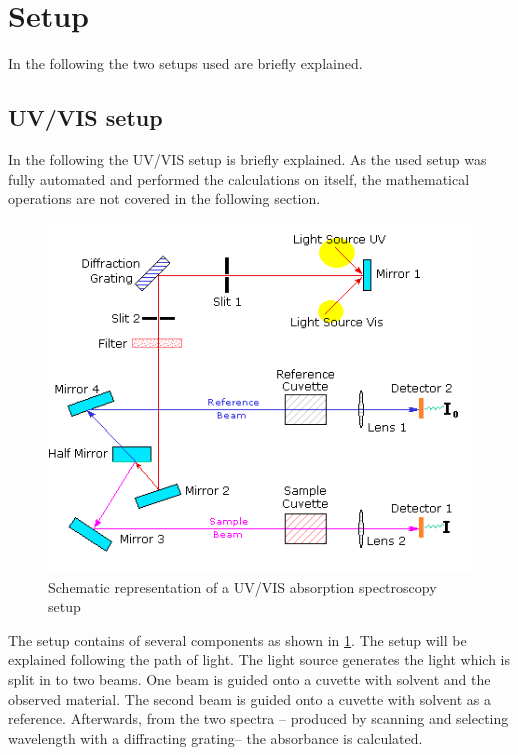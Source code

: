 \section{Setup}
\label{sec:Setup}
In the following the two setups used are briefly explained. 

\subsection{UV/VIS setup}

In the following the UV/VIS setup is briefly explained. As the used setup was fully automated and performed the calculations on 
itself, the mathematical operations are not covered in the following section.

\begin{figure}[ht]
    \centering
    \includegraphics[width = 13cm]{Bilder/Grundlagen/UVVISsetup.png}
    \caption{Schematic representation of a UV/VIS absorption spectroscopy setup}
    \label{fig:setupUVVIS}
\end{figure}

The setup contains of several components as shown in \cref{fig:setupUVVIS}. The setup will be explained following the path of light.
The light source generates the light which is split in to two beams. One beam is guided onto a cuvette with solvent and the observed material.
The second beam is guided onto a cuvette with solvent as a reference. Afterwards, from the two spectra
-- produced by scanning and selecting wavelength with a diffracting grating-- the absorbance is calculated. 

